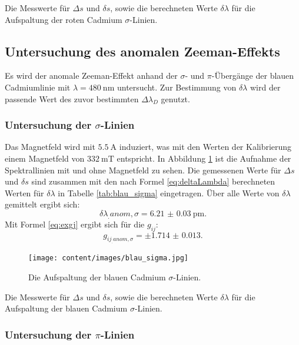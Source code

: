 \begin{table}
	\centering
	\caption{Die Messwerte für $\Delta s$ und $\delta s$, sowie die berechneten Werte $\delta\lambda$ für die Aufspaltung der roten Cadmium $\sigma$-Linien.}
	
	\label{tab:rot_sigma}
\end{table}

\subsection{Untersuchung des anomalen Zeeman-Effekts}

Es wird der anomale Zeeman-Effekt anhand der $\sigma$- und $\pi$-Übergänge der blauen Cadmiumlinie mit $\lambda=\SI{480}{\nano\metre}$ untersucht. Zur Bestimmung von $\delta\lambda$ wird der passende Wert des zuvor bestimmten $\Delta\lambda_D$ genutzt. 

\subsubsection{Untersuchung der $\sigma$-Linien}

Das Magnetfeld wird mit $\SI{5.5}{\ampere}$ induziert, was mit den Werten der Kalibrierung einem Magnetfeld von $\SI{332}{\milli\tesla}$ entspricht. In Abbildung \ref{fig:blau_sigma} ist die Aufnahme der Spektrallinien mit und ohne Magnetfeld zu sehen. Die gemessenen Werte für $\Delta s$ und $\delta s$ sind zusammen mit den nach Formel \eqref{eq:deltaLambda} berechneten Werten für $\delta\lambda$ in Tabelle \ref{tab:blau_sigma} eingetragen.
Über alle Werte von $\delta\lambda$ gemittelt ergibt sich:
\[
\delta\lambda_.{anom,\sigma} = \SI{6.21(3)}{\pico\metre}\text{.}
\]
Mit Formel \eqref{eq:exgj} ergibt sich für die $g_{ij}$:
\[
g_{ij_.{anom,\sigma}} = \pm\num{1.714(13)}\text{.}
\]

\begin{figure}
	\centering
	\texttt{[image: content/images/blau\_sigma.jpg]}
	\caption{Die Aufspaltung der blauen Cadmium $\sigma$-Linien.}
	\label{fig:blau_sigma}
\end{figure}

\begin{table}
	\centering
	\caption{Die Messwerte für $\Delta s$ und $\delta s$, sowie die berechneten Werte $\delta\lambda$ für die Aufspaltung der blauen Cadmium $\sigma$-Linien.}
	
	\label{tab:blau_sigma}
\end{table}

\subsubsection{Untersuchung der $\pi$-Linien}

